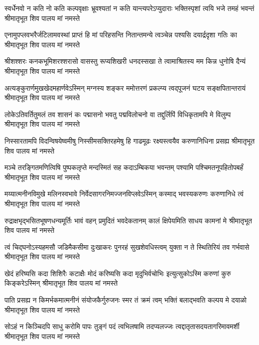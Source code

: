 \fourlineindentedshloka
{स्वर्धेनवो न कति नो कति कल्पवृक्षाः}
{भ्रूवश्यतां न कति यान्त्यपरेऽप्युदाराः}
{भक्तिस्पृशां त्वयि भजे तमहं भवन्तं}
{श्रीमातृभूत शिव पालय मां नमस्ते} %

\fourlineindentedshloka
{एनामुपप्लवभरैर्जटिलामवस्थां}
{प्राप्तं हि मां परिहसन्ति नितान्तमन्ये}
{त्वञ्चेन्न पश्यसि दयार्द्रदृशा गतिः का}
{श्रीमातृभूत शिव पालय मां नमस्ते} %

\fourlineindentedshloka
{श्रीशश्शरः कनकभूमिशरश्शरासो}
{वासस्तु रूप्यशिखरी धनदस्सखा ते}
{त्वामाश्रितस्य मम किन्न धुनोषि दैन्यं}
{श्रीमातृभूत शिव पालय मां नमस्ते} %

\fourlineindentedshloka
{अत्यङ्कुरार्णमुखखेदमहार्णवेऽस्मिन्}
{मग्नस्य शङ्कर ममोत्तरणं प्रकल्प्य}
{त्वद्पूजनं घटय सङ्क्षपितान्तरायं}
{श्रीमातृभूत शिव पालय मां नमस्ते} %

\fourlineindentedshloka
{लोकेऽतिवर्तितुमलं तव शासनं कः}
{पद्मासनो भवतु पद्मविलोचनो वा}
{तद्दुर्लिपिं विधिकृतामपि मे विलुम्प}
{श्रीमातृभूत शिव पालय मां नमस्ते} %

\fourlineindentedshloka
{निस्सारतामपि विदन्विषयेष्वमीषु}
{निस्सीमसक्तिरहमेषु हि गाढमूढः}
{रक्ष्यस्त्वयैव करुणानिधिना प्रसह्य}
{श्रीमातृभूत शिव पालय मां नमस्ते} %

\fourlineindentedshloka
{मञ्चे तरङ्गितमणित्विषि पुष्पकलृप्ते}
{मन्दस्मितं सह कदाऽम्बिकया भवन्तम्}
{पश्यामि पश्चिमतनूपहितोपबर्हं}
{श्रीमातृभूत शिव पालय मां नमस्ते} %

\fourlineindentedshloka
{मय्यात्मनीनविमुखे मलिनस्वभावे}
{निर्वेदसागरनिमज्जनविप्लवेऽस्मिन्}
{कस्माद् भवस्यकरुणः करुणानिधे त्वं}
{श्रीमातृभूत शिव पालय मां नमस्ते} %

\fourlineindentedshloka
{रुद्राक्षभृद्भसितभूषणधन्यमूर्तिः}
{भावं वहन् प्रमुदितं भवदेकतानम्}
{कालं क्षिपेयमिति साधय कामनां मे}
{श्रीमातृभूत शिव पालय मां नमस्ते} %

\fourlineindentedshloka
{त्वं चिद्घनोऽस्यहमसौ जडिमैकसीमा}
{दुःखाकरः पुनरहं सुखशेवधिस्त्वम्}
{युक्ता न ते स्थितिरियं तव गर्भवासे}
{श्रीमातृभूत शिव पालय मां नमस्ते} %

\fourlineindentedshloka
{खेदं हरिष्यसि कदा शिशिरैः कटाक्षैः}
{मोदं करिष्यसि कदा मृदुभिर्वचोभिः}
{ इत्युत्सुकोऽस्मि करुणां कुरु किङ्करेऽस्मिन्}
{श्रीमातृभूत शिव पालय मां नमस्ते} %

\fourlineindentedshloka
{पाति प्रसह्य न किमर्भकमात्मनीनं}
{संयोजकैर्गुरुजनः स्मर तं क्रमं त्वम्}
{भक्तिं बलाद्भवति कल्पय मे दयाळो}
{श्रीमातृभूत शिव पालय मां नमस्ते} %

\fourlineindentedshloka
{सोऽहं न किञ्चिदपि साधु करोमि पापः}
{तुङ्गं पदं त्वभिलषामि तदप्यलज्जः}
{त्वद्दातृतासदयतागरिमावमर्शी}
{श्रीमातृभूत शिव पालय मां नमस्ते} %

